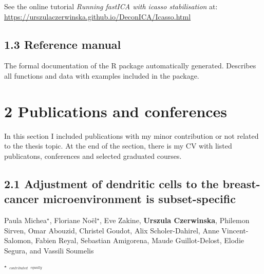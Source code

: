 \documentclass[12pt,]{book}
\theoremstyle{definition}
\theoremstyle{definition}
\theoremstyle{definition}
\theoremstyle{remark}
\begin{document}
See the online tutorial \emph{Running fastICA with icasso stabilisation}
at: \url{https://urszulaczerwinska.github.io/DeconICA/Icasso.html}



\newpage

\hypertarget{reference-manual}{%
\subsection*{1.3 Reference manual}\label{reference-manual}}

The formal documentation of the R package automatically generated.
Describes all functions and data with examples included in the package.



\newpage

\hypertarget{publications-and-conferences}{%
\section*{2 Publications and
conferences}\label{publications-and-conferences}}

In this section I included publications with my minor contribution or
not related to the thesis topic. At the end of the section, there is my
CV with listed publicatons, conferences and selected graduated courses.

\hypertarget{adjustment-of-dendritic-cells-to-the-breast-cancer-microenvironment-is-subset-specific}{%
\subsection*{2.1 Adjustment of dendritic cells to the breast-cancer
microenvironment is
subset-specific}\label{adjustment-of-dendritic-cells-to-the-breast-cancer-microenvironment-is-subset-specific}}

Paula Michea\(^\star\), Floriane Noël\(^\star\), Eve Zakine,
\textbf{Urszula Czerwinska}, Philemon Sirven, Omar Abouzid, Christel
Goudot, Alix Scholer-Dahirel, Anne Vincent-Salomon, Fabien Reyal,
Sebastian Amigorena, Maude Guillot-Delost, Elodie Segura, and Vassili
Soumelis

\(^\star\) \(^{_{contributed}}\) \(^{_{equally}}\)
\end{document}
